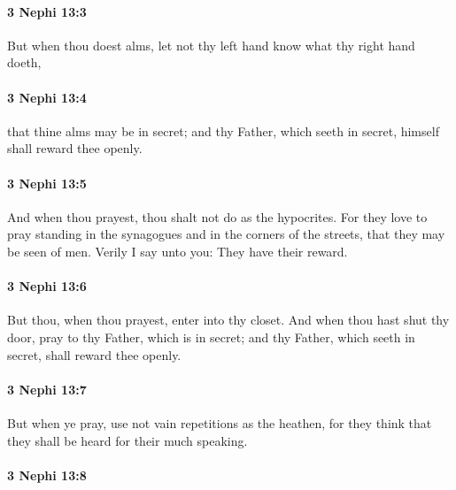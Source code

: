 		\paragraph{3 Nephi 13:3} %
			\label{3NEPHI-13-3}

			But when thou doest alms,
			let not thy left hand know what thy right hand doeth,

		\paragraph{3 Nephi 13:4} %
			\label{3NEPHI-13-4}

			that thine alms may be in secret;
			and thy Father, which seeth in secret, himself shall reward thee openly.

		\paragraph{3 Nephi 13:5} %
			\label{3NEPHI-13-5}

			And when thou prayest, thou shalt not do as the hypocrites.
			For they love to pray standing in the synagogues and in the corners of the streets,
			that they may be seen of men.
			Verily I say unto you:
			They have their reward.

		\paragraph{3 Nephi 13:6} %
			\label{3NEPHI-13-6}

			But thou, when thou prayest, enter into thy closet.
			And when thou hast shut thy door,
			pray to thy Father, which is in secret;
			and thy Father, which seeth in secret, shall reward thee openly.

		\paragraph{3 Nephi 13:7} %
			\label{3NEPHI-13-7}

			But when ye pray, use not vain repetitions as the heathen,
			for they think that they shall be heard for their much speaking.

		\paragraph{3 Nephi 13:8} %
			\label{3NEPHI-13-8}

